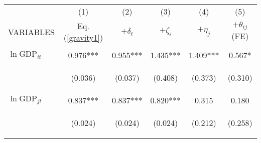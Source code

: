 \begin{center}
\begin{tabular}{lccccc} \hline
 & (1) & (2) & (3) & (4) & (5) \\
VARIABLES & Eq. (\ref{gravity1}) & $+\delta_t$ & $+\zeta_i$ & $+\eta_j$ & $+\theta_{ij}$ (FE) \\ \hline
\vspace{4pt} & \begin{footnotesize}\end{footnotesize} & \begin{footnotesize}\end{footnotesize} & \begin{footnotesize}\end{footnotesize} & \begin{footnotesize}\end{footnotesize} & \begin{footnotesize}\end{footnotesize} \\
$\ln\text{GDP}_{it}$ & 0.976*** & 0.955*** & 1.435*** & 1.409*** & 0.567* \\
\vspace{4pt} & \begin{footnotesize}(0.036)\end{footnotesize} & \begin{footnotesize}(0.037)\end{footnotesize} & \begin{footnotesize}(0.408)\end{footnotesize} & \begin{footnotesize}(0.373)\end{footnotesize} & \begin{footnotesize}(0.310)\end{footnotesize} \\
$\ln\text{GDP}_{jt}$ & 0.837*** & 0.837*** & 0.820*** & 0.315 & 0.180 \\
\vspace{4pt} & \begin{footnotesize}(0.024)\end{footnotesize} & \begin{footnotesize}(0.024)\end{footnotesize} & \begin{footnotesize}(0.024)\end{footnotesize} & \begin{footnotesize}(0.212)\end{footnotesize} & \begin{footnotesize}(0.258)\end{footnotesize} \\

\end{tabular}
\end{center}
